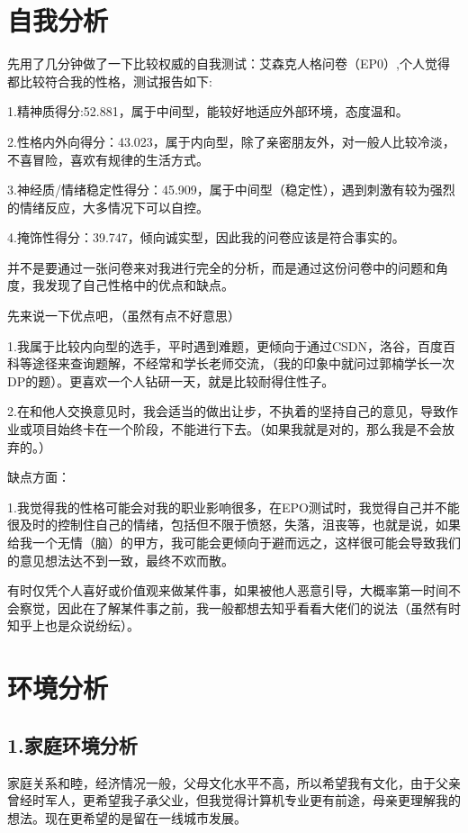 \documentclass{article}
\begin{document}
	\thispagestyle{empty}
	\newpage
	\setcounter{page}{1}
	\section{自我分析}
	先用了几分钟做了一下比较权威的自我测试：艾森克人格问卷（EP0）,个人觉得都比较符合我的性格，测试报告如下:\par
	1.精神质得分:52.881，属于中间型，能较好地适应外部环境，态度温和。\par
	2.性格内外向得分：43.023，属于内向型，除了亲密朋友外，对一般人比较冷淡，不喜冒险，喜欢有规律的生活方式。\par
	3.神经质/情绪稳定性得分：45.909，属于中间型（稳定性），遇到刺激有较为强烈的情绪反应，大多情况下可以自控。\par
	4.掩饰性得分：39.747，倾向诚实型，因此我的问卷应该是符合事实的。\par
	并不是要通过一张问卷来对我进行完全的分析，而是通过这份问卷中的问题和角度，我发现了自己性格中的优点和缺点。\par
	先来说一下优点吧，（虽然有点不好意思）\par
	1.我属于比较内向型的选手，平时遇到难题，更倾向于通过CSDN，洛谷，百度百科等途径来查询题解，不经常和学长老师交流，（我的印象中就问过郭楠学长一次DP的题）。更喜欢一个人钻研一天，就是比较耐得住性子。\par
	2.在和他人交换意见时，我会适当的做出让步，不执着的坚持自己的意见，导致作业或项目始终卡在一个阶段，不能进行下去。（如果我就是对的，那么我是不会放弃的。）\par
	缺点方面：\par
	1.我觉得我的性格可能会对我的职业影响很多，在EPO测试时，我觉得自己并不能很及时的控制住自己的情绪，包括但不限于愤怒，失落，沮丧等，也就是说，如果给我一个无情（脑）的甲方，我可能会更倾向于避而远之，这样很可能会导致我们的意见想法达不到一致，最终不欢而散。\par
	有时仅凭个人喜好或价值观来做某件事，如果被他人恶意引导，大概率第一时间不会察觉，因此在了解某件事之前，我一般都想去知乎看看大佬们的说法（虽然有时知乎上也是众说纷纭）。\par
	
	\section{环境分析}
	
	\subsection{1.家庭环境分析}
	家庭关系和睦，经济情况一般，父母文化水平不高，所以希望我有文化，由于父亲曾经时军人，更希望我子承父业，但我觉得计算机专业更有前途，母亲更理解我的想法。现在更希望的是留在一线城市发展。\par
\end{document}
